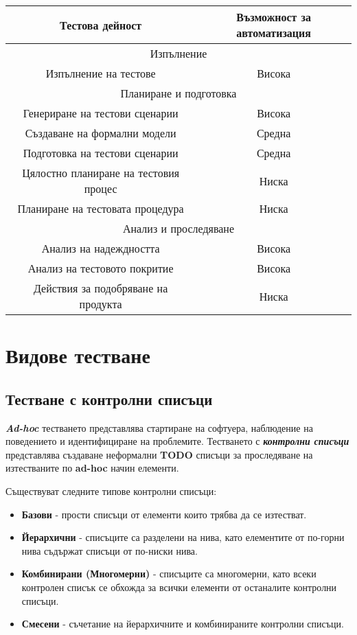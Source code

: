 \documentclass[fleqn,12pt]{article}
\begin{document}
\begin{center}
\begin{tabular}{ |c|c| }
    \hline
    Тестова дейност & Възможност за автоматизация \\
    \hline
    \multicolumn{2}{|c|}{Изпълнение} \\
    \hline
    Изпълнение на тестове & Висока \\
    \hline
    \multicolumn{2}{|c|}{Планиране и подготовка} \\
    \hline
    Генериране на тестови сценарии & Висока \\
    Създаване на формални модели & Средна \\
    Подготовка на тестови сценарии & Средна \\
    Цялостно планиране на тестовия процес & Ниска \\
    Планиране на тестовата процедура & Ниска \\
    \hline
    \multicolumn{2}{|c|}{Анализ и проследяване} \\
    \hline
    Анализ на надеждността & Висока \\
    Анализ на тестовото покритие & Висока \\
    Действия за подобряване на продукта & Ниска \\
    \hline
\end{tabular}
\end{center}

\section{Видове тестване}
\subsection{Тестване с контролни списъци}

\textbf{\textit{Ad-hoc}} тестването представлява стартиране на софтуера, наблюдение на поведението и идентифициране на проблемите.
Тестването с \textbf{\textit{контролни списъци}} представлява създаване неформални \textbf{TODO} списъци за проследяване на изтестваните по \textbf{ad-hoc} начин елементи.
\bigbreak

Съществуват следните типове контролни списъци:
\begin{itemize}
    \item \textbf{Базови} - прости списъци от елементи които трябва да се изтестват.
    \item \textbf{Йерархични} - списъците са разделени на нива, като елементите от по-горни нива съдържат списъци от по-ниски нива.
    \item \textbf{Комбинирани (Многомерни)} - списъците са многомерни, като всеки контролен списък се обхожда за всички елементи от останалите контролни списъци.
    \item \textbf{Смесени} - съчетание на йерархичните и комбинираните контролни списъци.
\end{itemize}
\end{document}
